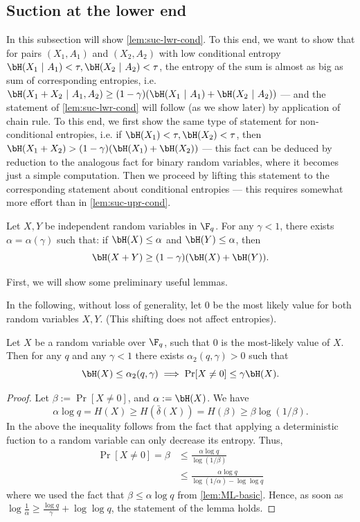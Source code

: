 \documentclass[11pt]{article}
\begin{document}
\subsection{Suction at the lower end}
In this subsection will show \cref{lem:suc-lwr-cond}. To this end, we want to show that for pairs $(X_1, A_1)$ and $(X_2, A_2)$ with low conditional entropy $\bH(X_1 ~|~ A_1) < \tau, \bH(X_2 ~|~ A_2) < \tau$, the entropy of the sum is almost as big as sum of corresponding entropies, i.e. $\bH(X_1 + X_2 ~|~ A_1, A_2) \geq (1 - \gamma)(\bH(X_1 ~|~ A_1) + \bH(X_2 ~|~ A_2))$ --- and the statement of \cref{lem:suc-lwr-cond} will follow (as we show later) by application of chain rule. To this end, we first show the same type of statement for non-conditional entropies, i.e. if $\bH(X_1) < \tau, \bH(X_2) < \tau$, then $\bH(X_1 + X_2) > (1 - \gamma)(\bH(X_1) + \bH(X_2))$ --- this fact can be deduced  by reduction to the analogous fact for binary random variables, where it becomes just a simple computation. Then we proceed by lifting this statement to the corresponding statement about conditional entropies --- this requires somewhat more effort than in \cref{lem:suc-upr-cond}.


\begin{lemma}
	\label{lem:suc-lwr}
	Let $X, Y$ be independent random variables in $\F_q$.
	For any $\gamma < 1$, there exists $\alpha=\alpha(\gamma)$ such that:
	if $\bH(X) \leq \alpha$ and $\bH(Y) \leq \alpha$, then
	$$\bH(X+Y) \geq (1-\gamma)(\bH(X) + \bH(Y)).$$
\end{lemma}

First, we will show some preliminary useful lemmas.
\begin{assumption}
	In the following,
	without loss of generality, let $0$ be the most likely value for both random variables $X, Y$. (This shifting does not affect entropies).
\end{assumption}


\begin{lemma}
	\label{lem:ML}
	Let $X$ be a random variable over $\F_q$, such that $0$
	is the most-likely value of $X$.
	Then for any $q$ and any $\gamma < 1$ there exists
	$\alpha_2(q,\gamma) > 0$ such that
	$$\bH(X) \leq \alpha_2(q,\gamma) \implies \Pr[X \neq 0] \leq \gamma \bH(X).$$
\end{lemma}
\begin{proof}
	Let $\beta := \Pr[X \neq 0]$, and $\alpha := \bH(X)$.
	We have
	$$
	\alpha \log q = H(X) \geq H(\bar\delta(X))
	= H(\beta)
	\geq \beta\log(1/\beta).
	$$
	In the above the inequality follows from the fact that applying a deterministic fuction to a random variable can only decrease its entropy.
	Thus,
	\begin{align*}
		\Pr[X \neq 0] = \beta &\leq \frac{\alpha \log q}{\log(1/\beta)}\\
		&\leq \frac{\alpha \log q}{\log(1/\alpha) - \log \log q}
	\end{align*}
	where we used the fact that $\beta \leq \alpha \log q$
	from \cref{lem:ML-basic}. Hence, as soon as $\log \frac{1}{\alpha} \ge \frac{\log q}{\gamma} + \log \log q$, the statement of the lemma holds.
\end{proof}
\end{document}
